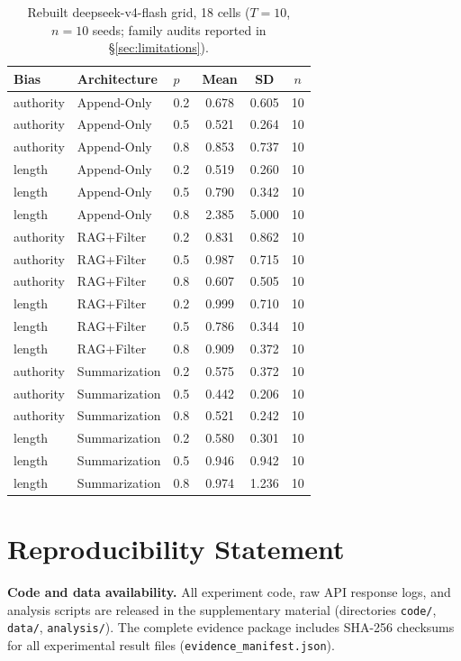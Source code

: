 \documentclass[11pt]{article}
\begin{document}
\begin{table}[htbp]
\centering
\caption{Rebuilt deepseek-v4-flash grid, 18 cells ($T{=}10$, $n{=}10$ seeds; family audits reported in \S\ref{sec:limitations}).}
\label{tab:supp-full-v4flash}
\small
\begin{tabular}{lllccc}
\toprule
Bias & Architecture & $p$ & Mean & SD & $n$ \\
\midrule
authority & Append-Only & 0.2 & 0.678 & 0.605 & 10 \\
authority & Append-Only & 0.5 & 0.521 & 0.264 & 10 \\
authority & Append-Only & 0.8 & 0.853 & 0.737 & 10 \\
length & Append-Only & 0.2 & 0.519 & 0.260 & 10 \\
length & Append-Only & 0.5 & 0.790 & 0.342 & 10 \\
length & Append-Only & 0.8 & 2.385 & 5.000 & 10 \\
authority & RAG+Filter & 0.2 & 0.831 & 0.862 & 10 \\
authority & RAG+Filter & 0.5 & 0.987 & 0.715 & 10 \\
authority & RAG+Filter & 0.8 & 0.607 & 0.505 & 10 \\
length & RAG+Filter & 0.2 & 0.999 & 0.710 & 10 \\
length & RAG+Filter & 0.5 & 0.786 & 0.344 & 10 \\
length & RAG+Filter & 0.8 & 0.909 & 0.372 & 10 \\
authority & Summarization & 0.2 & 0.575 & 0.372 & 10 \\
authority & Summarization & 0.5 & 0.442 & 0.206 & 10 \\
authority & Summarization & 0.8 & 0.521 & 0.242 & 10 \\
length & Summarization & 0.2 & 0.580 & 0.301 & 10 \\
length & Summarization & 0.5 & 0.946 & 0.942 & 10 \\
length & Summarization & 0.8 & 0.974 & 1.236 & 10 \\
\bottomrule
\end{tabular}
\end{table}


\section*{Reproducibility Statement}

\textbf{Code and data availability.} All experiment code, raw API response logs, and analysis scripts are released in the supplementary material (directories \texttt{code/}, \texttt{data/}, \texttt{analysis/}). The complete evidence package includes SHA-256 checksums for all experimental result files (\texttt{evidence\_manifest.json}).
\end{document}
